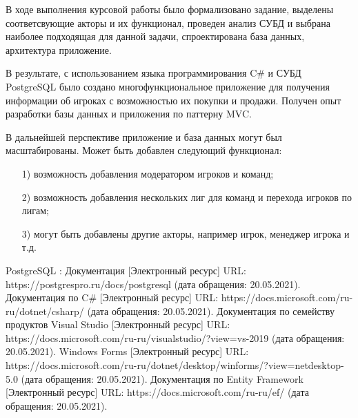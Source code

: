 В ходе выполнения курсовой работы было формализовано задание, выделены соответсвующие акторы и их функционал, проведен анализ СУБД и выбрана наиболее подходящая для данной задачи, спроектирована база данных, архитектура приложение.

В результате, с использованием языка программирования C\# и СУБД PostgreSQL было создано многофункциональное приложение для получения информации об игроках с возможностью их покупки и продажи. Получен опыт разработки базы данных и приложения по паттерну MVC. 

В дальнейшей перспективе приложение и база данных могут был масштабированы. Может быть добавлен следующий функционал:
\begin{itemize}
	\item[1)] возможность добавления модератором игроков и команд;
	\item[2)] возможность добавления нескольких лиг для команд и перехода игроков по лигам;
	\item[3)] могут быть добавлены другие акторы, например игрок, менеджер игрока и т.д.
\end{itemize}

\clearpage
\begin{thebibliography}{9}
	 PostgreSQL : Документация [Электронный ресурс] URL: https://postgrespro.ru/docs/postgresql (дата обращения: 20.05.2021).
	 Документация по C\# [Электронный ресурс] URL: https://docs.microsoft.com/ru-ru/dotnet/csharp/ (дата обращения: 20.05.2021).
	 Документация по семейству продуктов Visual Studio [Электронный ресурс] URL: https://docs.microsoft.com/ru-ru/visualstudio/?view=vs-2019 (дата обращения: 20.05.2021).
	 Windows Forms [Электронный ресурс] URL: https://docs.microsoft.com/ru-ru/dotnet/desktop/winforms/?view=netdesktop-5.0 (дата обращения: 20.05.2021).
	 Документация по Entity Framework [Электронный ресурс] URL: https://docs.microsoft.com/ru-ru/ef/ (дата обращения: 20.05.2021).
\end{thebibliography}
 
